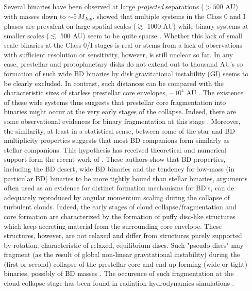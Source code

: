 Several binaries have been observed at large {\it projected} separations ($>500$ AU) with masses down to $\sim 5\,M_{Jup}$. \cite{Looney2000} showed that multiple systems in the Class 0 and I phases are prevalent on large spatial scales ($\gtrsim$ 1000 AU) 
while binary systems at smaller scales ($\lesssim$ 500 AU) seem to be quite sparse \citep{Maury2010}.
Whether this lack of small scale binaries at the Class 0/I stages is real or stems from a lack of observations with sufficient resolution or sensitivity, however, is still unclear so far.
In any case, prestellar and protoplanetary disks do not extend out to thousand AU's so
formation of such wide BD binaries by disk gravitational instability (GI) seems to be clearly excluded. In contrast, such distances can be compared with the characteristic sizes of starless prestellar core envelopes, $\sim 10^4$ AU \citep{Menshchikov2010}. The existence of these wide systems thus suggests
that prestellar core fragmentation into binaries might occur at the very early stages of the collapse. Indeed, there are some observational evidences for binary fragmentation at this stage \citep{Looney2000,Duchene2003}. Moreover, the similarity, at least in a statistical sense, between some of the star and BD multiplicity properties suggests that most BD companions form similarly as stellar companions. This hypothesis has received theoretical 
and numerical support
form the recent work of \cite{Jumper2013}. These authors show that BD properties, including the BD desert, wide BD binaries and the tendency for low-mass (in particular BD) binaries to be more tightly bound than stellar binaries, arguments often used as an evidence for distinct formation mechanisms for BD's, can de adequately reproduced by angular momentum scaling during the collapse of turbulent clouds. 
Indeed, the early stages of cloud collapse/fragmentation and core formation are characterized by the formation of puffy disc-like structures which keep accreting material 
from the surrounding core envelope. These structures, however, are not relaxed and differ from structures purely supported by rotation, characteristic of relaxed, equilibrium discs.
Such "pseudo-discs" may fragment (as the result of global non-linear gravitational instability) during the (first or second) collapse of the prestellar core and end up forming (wide or tight) binaries, 
possibly of BD masses \citep{Bonnell1994, Machida2008}. 
The occurence of such fragmentation at the cloud collapse stage has been found in radiation-hydrodynamics simulations \citep{Commercon2010, Peters2011, Bate2012}. 
